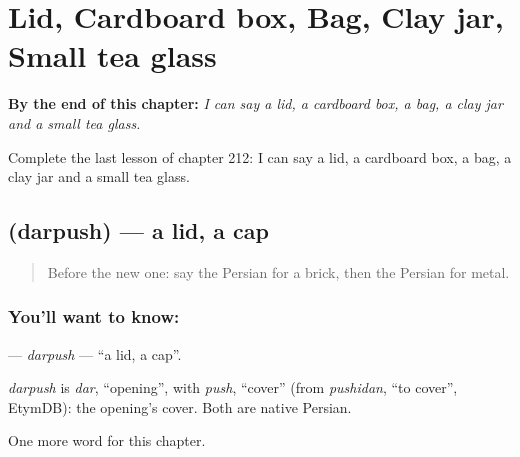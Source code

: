 
\chapter{Lid, Cardboard box, Bag, Clay jar, Small tea glass}
\label{ch:fa-lid-cardboard-box-bag-clay-jar-small-tea-glass}

\begin{chapteropening}
\textbf{By the end of this chapter:} \emph{I can say a lid, a cardboard box, a bag, a clay jar and a small tea glass.}

Complete the last lesson of chapter 212: I can say a lid, a cardboard box, a bag, a clay jar and a small tea glass.
\end{chapteropening}

\section[\texorpdfstring{\fa{درپوش} (darpush)}{درپوش (darpush)}]{ (darpush) — a lid, a cap}

\label{lesson:FA-C212-darpush}



\begin{quote}
Before the new one: say the Persian for a brick, then the Persian for metal.
\end{quote}

\subsection*{You'll want to know: }
\textbf{} — \emph{darpush} — \textquotedblleft{}a lid, a cap\textquotedblright{}.

\begin{cousinweb}
\emph{darpush} is \emph{dar}, \textquotedblleft{}opening\textquotedblright{}, with \emph{push}, \textquotedblleft{}cover\textquotedblright{} (from \emph{pushidan}, \textquotedblleft{}to cover\textquotedblright{}, EtymDB): the opening's cover. Both are native Persian.
\end{cousinweb}

\begin{grammarlens}[title={What you've built}]
One more word for this chapter.
\end{grammarlens}

